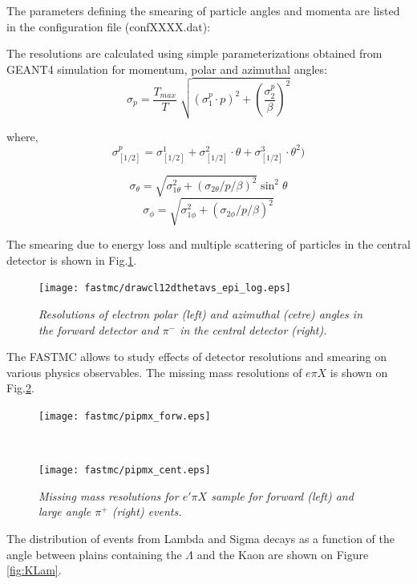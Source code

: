 The parameters defining the smearing of particle angles and momenta 
are listed in the configuration  file (confXXXX.dat):


The resolutions are calculated using simple parameterizations obtained from GEANT4 simulation
for momentum, polar and azimuthal angles:
\begin{equation}
\sigma_p =  \frac{T_{max}}{T} \sqrt[]{(\sigma_1^p \cdot p)^2 + (\frac{\sigma_2^p}{\beta})^2}
\end{equation}

where,
$$
\sigma_{[1/2]}^p = \sigma_{[{1/2}]}^1 + \sigma_{[{1/2}]}^2 \cdot \theta + \sigma_{[{1/2}]}^3 \cdot \theta^2)
$$


$$
\sigma_\theta=\sqrt{\sigma_{1\theta}^2+(\sigma_{2\theta}/p/\beta)^2}\sin^2\theta
$$
$$
\sigma_\phi=\sqrt{\sigma_{1\phi}^2+(\sigma_{2\phi}/p/\beta)^2}
$$

The smearing due to energy loss and multiple scattering of particles in the central detector
is shown in Fig.\ref{fig:smear}.


\begin{figure}[htbp] %
   \centering
   \texttt{[image: fastmc/drawcl12dthetavs\_epi\_log.eps]} 
   \caption{\it Resolutions of electron polar (left) and azimuthal (cetre) angles in the forward
detector and $\pi^-$  in the central detector (right).
}
\label{fig:smear}
\end{figure}

The FASTMC allows to study effects of detector resolutions and smearing on various 
physics observables. The missing mass resolutions of $e\pi X$ is shown on
Fig.\ref{fig:epX}.



\begin{figure}[htb]
\begin{minipage}[b]{6.0cm}
 \texttt{[image: fastmc/pipmx\_forw.eps]}
\end{minipage}
    \ \hspace{0mm} \hspace{0mm} \
\begin{minipage}[b]{6.0cm}
\texttt{[image: fastmc/pipmx\_cent.eps]}
\end{minipage}
\caption{\it Missing mass resolutions for $e'\pi X$ sample for forward  (left) and 
large angle $\pi^+$ (right) events.
}
\label{fig:epX}
\end{figure}

The distribution of events from Lambda and Sigma decays as a function of the angle between
plains containing the $\Lambda$ and the Kaon are shown on Figure \ref{fig:KLam}.

